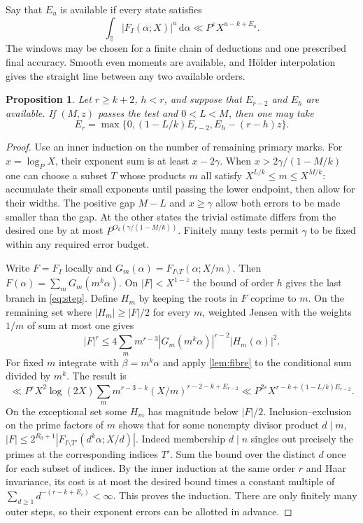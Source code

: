 \documentclass[11pt,letterpaper]{article}
\newtheorem{proposition}[proposition]{Proposition}
\theoremstyle{definition}
\newcommand{\T}{\mathbb T}
\newcommand{\dd}{\,\mathrm d}
\newcommand{\eps}{\varepsilon}
\begin{document}
Say that $E_u$ is available if every state satisfies
\[
 \int_{\T}|F_I(\alpha;X)|^u\dd\alpha\ll P^\eps X^{u-k+E_u}.
\]
The windows may be chosen for a finite chain of deductions and one
prescribed final accuracy. Smooth even moments are available, and H\"older
interpolation gives the straight line between any two available orders.
\begin{proposition}\label{prop:step}
Let $r\ge k+2$, $h<r$, and suppose that $E_{r-2}$ and $E_h$
are available. If $(M,z)$ passes the test and $0<L<M$, then one may take
\begin{equation}\label{eq:step}
 E_r=\max\{0,(1-L/k)E_{r-2},E_h-(r-h)z\}.
\end{equation}
\end{proposition}
\begin{proof}
Use an inner induction on the number of remaining primary marks.
For $x=\log_P X$, their exponent sum is at least $x-2\gamma$.
When $x>2\gamma/(1-M/k)$ one can choose a subset $T$ whose products
$m$ all satisfy $X^{L/k}\le m\le X^{M/k}$: accumulate their small
exponents until passing the lower endpoint, then allow for their widths.
The positive gap $M-L$ and $x\ge\gamma$ allow both errors to be made
smaller than the gap. At the other states the trivial estimate differs
from the desired one by at most $P^{O_k(\gamma/(1-M/k))}$. Finitely
many tests permit $\gamma$ to be fixed within any required error budget.

Write $F=F_I$ locally and $G_m(\alpha)=F_{I\setminus T}(\alpha;X/m)$.
Then $F(\alpha)=\sum_m G_m(m^k\alpha)$. On $|F|<X^{1-z}$ the
bound of order $h$ gives the last branch in \eqref{eq:step}. Define
$H_m$ by keeping the roots in $F$ coprime to $m$. On the remaining
set where $|H_m|\ge|F|/2$ for every $m$, weighted Jensen with the
weights $1/m$ of sum at most one gives
\[
 |F|^r\le4\sum_m m^{r-3}|G_m(m^k\alpha)|^{r-2}|H_m(\alpha)|^2.
\]
For fixed $m$ integrate with $\beta=m^k\alpha$ and apply
\cref{lem:fibre} to the conditional sum divided by $m^k$. The result is
\[
 \ll P^\eps X^2\log(2X)\sum_m m^{r-3-k}
 (X/m)^{r-2-k+E_{r-2}}
 \ll P^{2\eps} X^{r-k+(1-L/k)E_{r-2}}.
\]
On the exceptional set some $H_m$ has magnitude below $|F|/2$.
Inclusion--exclusion on the prime factors of $m$ shows that for some
nonempty divisor product $d\mid m$,
$|F|\le 2^{R_0+1}|F_{I\setminus T'}(d^k\alpha;X/d)|$.
Indeed membership $d\mid n$ singles out precisely the primes at the
corresponding indices $T'$. Sum the bound over the distinct $d$ once
for each subset of indices. By the inner induction at the same order
$r$ and Haar invariance, its cost is at most the desired bound times
a constant multiple of $\sum_{d\ge1}d^{-(r-k+E_r)}<\infty$.
This proves the induction. There are only finitely many outer steps,
so their exponent errors can be allotted in advance.
\end{proof}
\end{document}
